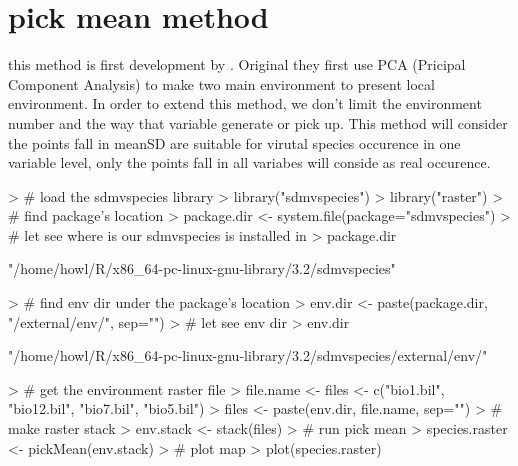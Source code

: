 \documentclass{report}
\begin{document}
\section*{pick mean method}
this method is first development by \citet{jimenez-valverde_threshold_2007}. Original they first use PCA (Pricipal Component Analysis) to make two main environment to present
local environment. In order to extend this method, we don't limit the environment number and the way that variable generate or pick up.
This method will consider the points fall in mean\textpm SD are suitable for virutal species occurence in one variable level, only the points fall in all variabes will conside as real occurence.
\begin{Schunk}
\begin{Sinput}
> # load the sdmvspecies library
> library("sdmvspecies")
> library("raster")
> # find package's location
> package.dir <- system.file(package="sdmvspecies")
> # let see where is our sdmvspecies is installed in
> package.dir
\end{Sinput}
\begin{Soutput}
[1] "/home/howl/R/x86_64-pc-linux-gnu-library/3.2/sdmvspecies"
\end{Soutput}
\begin{Sinput}
> # find env dir under the package's location
> env.dir <- paste(package.dir, "/external/env/", sep="")
> # let see env dir
> env.dir
\end{Sinput}
\begin{Soutput}
[1] "/home/howl/R/x86_64-pc-linux-gnu-library/3.2/sdmvspecies/external/env/"
\end{Soutput}
\begin{Sinput}
> # get the environment raster file
> file.name <- files <- c("bio1.bil", "bio12.bil", "bio7.bil", "bio5.bil")
> files <- paste(env.dir, file.name, sep="")
> # make raster stack
> env.stack <- stack(files)
> # run pick mean
> species.raster <- pickMean(env.stack)
> # plot map
> plot(species.raster)
\end{Sinput}
\end{Schunk}
\end{document}
